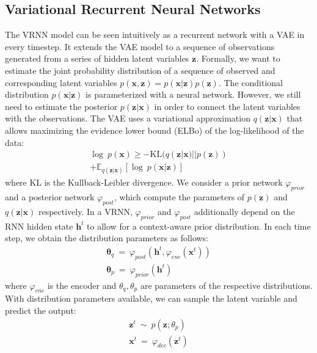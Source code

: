 \subsection{Variational Recurrent Neural Networks}
\label{02:sec:vrnn}
The VRNN model \cite{chung2015recurrent} can be seen intuitively as a recurrent network with a VAE in every timestep.
It extends the VAE model to a sequence of observations generated from a series of hidden latent variables $\mathbf{z}$.
Formally, we want to estimate the joint probability distribution of a sequence of observed and corresponding latent variables $p(\mathbf{x}, \mathbf{z}) = p(\mathbf{x}|\mathbf{z})p(\mathbf{z})$.
The conditional distribution $p(\mathbf{x}|\mathbf{z})$ is parameterized with a neural network.
However, we still need to estimate the posterior $p(\mathbf{z}|\mathbf{x})$ in order to connect the latent variables with the observations.
The VAE uses a variational approximation $q(\mathbf{z}|\mathbf{x})$ that allows maximizing the evidence lower bound (ELBo) of the log-likelihood of the data:
\begin{equation}
\begin{split}
    \log~p(\mathbf{x}) \ge -\mathrm{KL}(q(\mathbf{z}|\mathbf{x})||p(\mathbf{z}))\\ + \mathbb{E}_{q(\mathbf{z}|\mathbf{x})}[\log~p(\mathbf{x}|\mathbf{z})]
    \label{eq:vae}
\end{split}
\end{equation}
where KL is the Kullback-Leibler divergence.
We consider a prior  network $\varphi_{prior}$ and a posterior network $\varphi_{post}$, which compute the parameters of $p(\mathbf{z})$ and $q(\mathbf{z}|\mathbf{x})$ respectively.
In a VRNN, $\varphi_{prior}$ and $\varphi_{post}$ additionally depend on the RNN hidden state $\mathbf{h}^t$ to allow for a context-aware prior distribution.
In each time step, we obtain the distribution parameters as follows:
\begin{equation}
\label{eq:distr_theta}
\begin{gathered}
    \mathbf{\theta}_{q}~=~\varphi_{post}(\mathbf{h}^t, \varphi_{enc}(\mathbf{x}^t))\\
    \mathbf{\theta}_{p}~=~\varphi_{prior}(\mathbf{h}^t)
\end{gathered}
\end{equation}
where $\varphi_{enc}$ is the encoder and $\theta_q, \theta_p$ are parameters of the respective distributions.
With distribution parameters available, we can sample the latent variable and predict the output:
\begin{equation}
\label{eq:x_infer}
\begin{gathered}
    \mathbf{z}^t~\mathtt{\sim}~p(\mathbf{z};\theta_{p})\\
    \mathbf{x}^t~=~ \varphi_{dec}(\mathbf{z}^t)
\end{gathered}
\end{equation}
